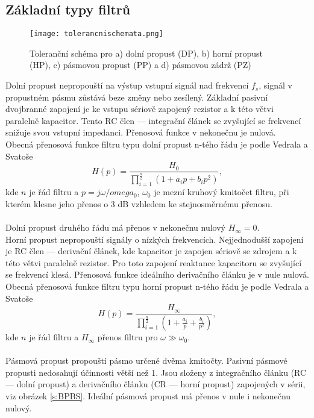 \subsection{Základní typy filtrů}
\begin{figure}[h]
\centering
\texttt{[image: tolerancnischemata.png]}
\caption[Toleranční schéma dolní propusti (DP), horní propusti (HP), pásmové propusti (PP) a pásmové zádrže]{Toleranční schéma pro a) dolní propust (DP), b) horní propust (HP), c) pásmovou propust (PP) a d) pásmovou zádrž (PZ)\cite{7}}
\end{figure}
\noindent Dolní propust nepropouští na výstup vstupní signál nad frekvencí $f_s$, signál v propustném pásmu zůstává beze změny nebo zesílený. Základní pasivní dvojbranné zapojení je ke vstupu sériově zapojený rezistor a k této větvi paralelně kapacitor. Tento RC člen --- integrační článek se zvyšující se frekvencí snižuje svou vstupní impedanci. Přenosová funkce v nekonečnu je nulová. \\
Obecná přenosová funkce filtru typu dolní propust n-tého řádu je podle Vedrala a Svatoše~\cite{8}
\begin{equation}
H(p) = \frac{H_0}{\prod_{i=1}^{\frac{n}{2}} (1 + a_i p + b_i p^2)} \label{r:FTR},
\end{equation}
kde $n$ je řád filtru a $p = j\omega/omega_0$, $\omega_0$ je mezní kruhový kmitočet filtru, při kterém klesne jeho přenos o 3 dB vzhledem ke stejnosměrnému přenosu.\\
\\
Dolní propust druhého řádu má přenos v nekonečnu nulový $H_{\infty} = 0$. \\
Horní propust nepropouští signály o nízkých frekvencích. Nejjednodušší zapojení je RC člen --- derivační článek, kde kapacitor je zapojen sériově se zdrojem a k této větvi paralelně rezistor. Pro toto zapojení reaktance kapacitoru se zvyšující se frekvencí klesá. Přenosová funkce ideálního derivačního článku je v nule nulová. \\
Obecná přenosová funkce filtru typu horní propust n-tého řádu je podle Vedrala a Svatoše~\cite{8}
\begin{equation}
H(p) = \frac{H_{\infty}}{\prod_{i=1}^{\frac{n}{2}} (1 + \frac{a_i}{p} + \frac{b_i}{p^2})} \label{r:FTR2},
\end{equation}
kde $n$ je řád filtru a $H_{\infty}$ přenos filtru pro $\omega \gg \omega_0$.\\
\\
\noindent Pásmová propust propouští pásmo určené dvěma kmitočty. Pasivní pásmové propusti nedosahují účinnosti větší než 1. Jsou složeny z integračního článku (RC --- dolní propust) a derivačního článku (CR --- horní propust) zapojených v sérii, viz obrázek \ref{s:BPBS}. Ideální pásmová propust má přenos v nule i nekonečnu nulový. \\
